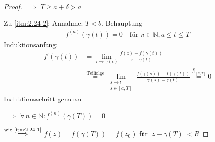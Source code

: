 \begin{theorem}[Satz]
\begin{proof}
    $\implies$ $T \geq a + \delta > a$
    
    Zu \ref{itm:2.24 2}: Annahme: $T < b$. Behauptung
    \begin{align*}
      f^{(n)} (\gamma(t)) = 0 \quad \text{für } n \in \mathbb{N}, a \leq t \leq T
    \end{align*}
    Induktionsanfang:
    \begin{align*}
      f'(\gamma(t)) &= \lim\limits_{z \to \gamma(t)} \frac{f(z) - f(\gamma(t))}{z - \gamma(t)} \\
      &\overset{\text{Teilfolge}}{=} \lim\limits_{\substack{s \to t \\ s \in [a,T]}} \frac{f(\gamma(s)) - f(\gamma(t))}{\gamma(s) - \gamma(t)} \overset{f|_{[a,T]}}{=} 0
    \end{align*}
    Induktionsschritt genauso.
    
    $\implies$ $\forall \, n \in \mathbb{N} : f^{(n)}(\gamma(T)) = 0$
    
    $\overset{\text{wie \ref{itm:2.24 1}}}{\implies}$ $f(z) = f(\gamma(T)) = f(z_0)$ für $|z-\gamma(T)| < R$
  \end{proof}
\end{theorem}
